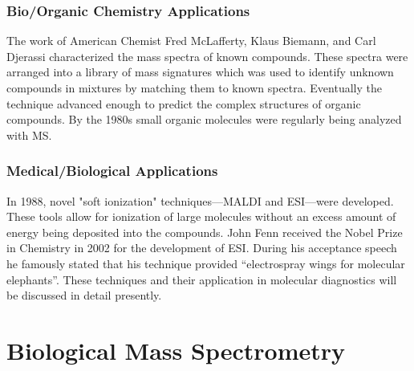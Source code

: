 \documentclass[letterpaper, 10 pt, conference]{ieeeconf}  %
\begin{document}
        \vspace{5 pt}

        \subsubsection[\textbf{Bio/Organic Chemistry Applications}]{\textbf{Bio/Organic Chemistry Applications}\autocite{R8}}\hfill \hfill 
        
        The work of American Chemist Fred McLafferty, Klaus Biemann, and Carl Djerassi characterized the mass spectra of known compounds. These spectra were arranged into a library of mass signatures which was used to identify unknown compounds in mixtures by matching them to known spectra. Eventually the technique advanced enough to predict the complex structures of organic compounds. By the 1980s small organic molecules were regularly being analyzed with MS.

        \vspace{5 pt}

        \subsubsection[\textbf{Medical/Biological Applications}]{\textbf{Medical/Biological Applications}\autocite{R8}}\hfill \hfill

        In 1988, novel "soft ionization" techniques---MALDI and ESI---were developed. These tools allow for ionization of large molecules without an excess amount of energy being deposited into the compounds. John Fenn received the Nobel Prize in Chemistry in 2002 for the development of ESI. During his acceptance speech he famously stated that his technique provided “electrospray wings for molecular elephants”. These techniques and their application in molecular diagnostics will be discussed in detail presently.

    \section{\textbf{Biological Mass Spectrometry}}
\end{document}
